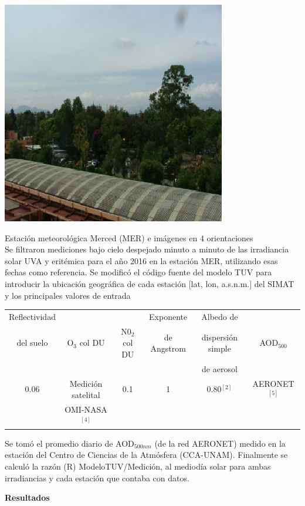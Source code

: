 \documentclass{article}
\begin{document}
\begin{minipage}{0.53\linewidth}
\begin{minipage}{0.23\linewidth}
\includegraphics[scale=0.68]{images/sureste.eps}
\end{minipage}
\changefontsizes{9pt}
\textcolor{bl}{Estación meteorológica Merced (MER) e imágenes en 4 orientaciones}\\
\changefontsizes{12pt}
Se filtraron mediciones bajo cielo despejado minuto a minuto de las
irradiancia solar UVA y eritémica para el año 2016 en la estación MER,
utilizando esas fechas como referencia. Se modificó el código fuente del
modelo TUV para introducir la ubicación geográfica de cada estación
[lat, lon, a.s.n.m.] del SIMAT y los principales valores de entrada
\begin{center}
\changefontsizes{8.5pt}
\begin{tabular}{|c|c|c|c|c|c|} \hline
Reflectividad & & & Exponente & Albedo de &  \\
del suelo &O$_3$ col DU &N0$_2$ col DU &de Angstrom &  dispersión simple &AOD$_{500}$ \\
& & && de aerosol&  \\ \hline
0.06 & Medición satelital & 0.1 & 1 & 0.80$^{[2]}$ & AERONET$^{[5]}$ \\
& OMI-NASA$^{[4]}$ & &&& \\ \hline
\end{tabular}
\end{center}
Se tomó el promedio diario de AOD$_{500nm}$ (de la red AERONET) medido
en la estación del Centro de Ciencias de la Atmósfera (CCA-UNAM).
Finalmente se calculó la razón (R) ModeloTUV/Medición, al mediodía
solar para ambas irradiancias y cada estación que contaba con datos.
\end{minipage}
\begin{center}
\begin{shaded}
\textbf{\textcolor{ver}{Resultados}}
\end{shaded}
\end{center}
\end{document}
